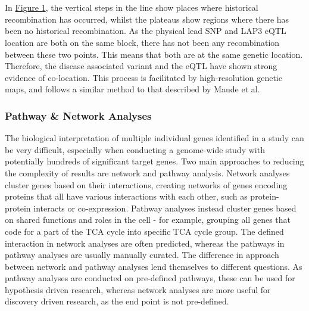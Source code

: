 \documentclass{article}
\begin{document}
\\
\\In \hyperref[fig:block]{Figure 1}, the vertical steps in the line show places where historical recombination has occurred, whilst the plateaus show regions where there has been no historical recombination. As the physical lead SNP and LAP3 eQTL location are both on the same block, there has not been any recombination between these two points. This means that both are at the same genetic location. Therefore, the disease associated variant and the eQTL have shown strong evidence of co-location.
This process is facilitated by high-resolution genetic maps\cite{Maniatis2004PositionalDisequilibrium.}, and follows a similar method to that described by Maude et al.\cite{Maude2021NewDiabetes.}
\newpage
\subsubsection{Pathway \& Network Analyses}
\label{subsubsec:pathwaysandnetworks}
The biological interpretation of multiple individual genes identified in a study can be very difficult, especially when conducting a genome-wide study with potentially hundreds of significant target genes. Two main approaches to reducing the complexity of results are network and pathway analysis. Network analyses cluster genes based on their interactions, creating networks of genes encoding proteins that all have various interactions with each other\cite{Maayan2011IntroductionBiology}, such as protein-protein interacts or co-expression. Pathway analyses instead cluster genes based on shared functions and roles in the cell\cite{Garcia-Campos2015PathwayArt} - for example, grouping all genes that code for a part of the TCA cycle into specific TCA cycle group. The defined interaction in network analyses are often predicted, whereas the pathways in pathway analyses are usually manually curated. The difference in approach between network and pathway analyses lend themselves to different questions. As pathway analyses are conducted on pre-defined pathways, these can be used for hypothesis driven research, whereas network analyses are more useful for discovery driven research, as the end point is not pre-defined.
\\
\end{document}
